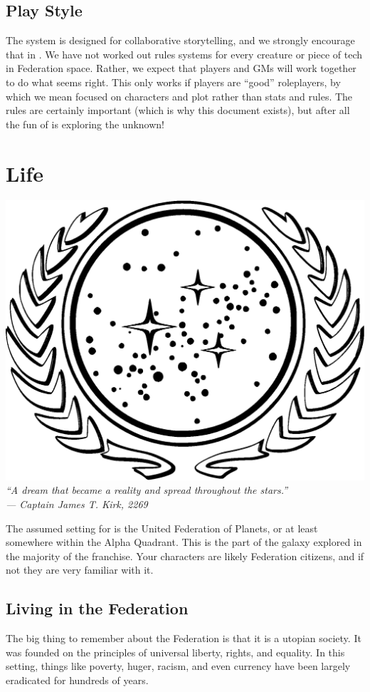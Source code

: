 \documentclass[12pt,titlepage,openany]{book}
\begin{document}
\section{Play Style}\label{sec:play-style}
The \FateCore{} system is designed for collaborative storytelling, and we
strongly encourage that in \StarTrekFate{}. We have not worked out rules
systems for every creature or piece of tech in Federation space. Rather, we
expect that players and GMs will work together to do what seems right. This
only works if players are ``good'' roleplayers, by which we mean focused on
characters and plot rather than stats and rules. The rules are certainly
important (which is why this document exists), but after all the fun of
\StarTrek{} is exploring the unknown!



\chapter{\StarTrek{} Life}\label{chap:life}

\begin{center}
    \includegraphics[width=0.5\linewidth]{img/Federation.eps}\\
    \vspace{2ex}
    \textit{``A dream that became a reality and spread throughout the
    stars.''\\ --- Captain James T. Kirk, 2269}
\end{center}

\noindent The assumed setting for \StarTrekFate{} is the United Federation of
Planets, or at least somewhere within the Alpha Quadrant. This is the part of
the galaxy explored in the majority of the \StarTrek{} franchise. Your
characters are likely Federation citizens, and if not they are very familiar
with it.

\section{Living in the Federation}\label{sec:living-federation}
The big thing to remember about the Federation is that it is a utopian society.
It was founded on the principles of universal liberty, rights, and equality. In
this setting, things like poverty, huger, racism, and even currency have been
largely eradicated for hundreds of years.
\end{document}
